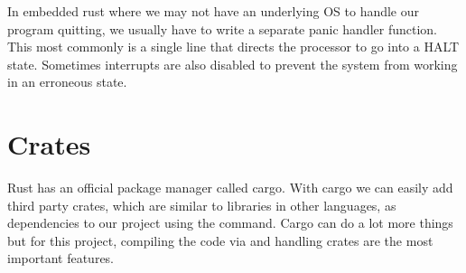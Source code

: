 In embedded rust where we may not have an underlying OS to handle our program quitting, we usually have to write a separate panic handler function. This most commonly is a single line that directs the processor to go into a HALT state. Sometimes interrupts are also disabled to prevent the system from working in an erroneous state.

\section{Crates}

Rust has an official package manager called cargo. With cargo we can easily add third party crates, which are similar to libraries in other languages, as dependencies to our project using the  command. Cargo can do a lot more things but for this project, compiling the code via  and handling crates are the most important features.
